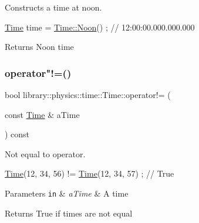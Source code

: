 Constructs a time at noon. 


\begin{DoxyCode}
\hyperlink{classlibrary_1_1physics_1_1time_1_1_time_a46a4b9be1451041ae65332f04db21c4b}{Time} time = \hyperlink{classlibrary_1_1physics_1_1time_1_1_time_a3d67891fe71e3b5ba62c6517477e7698}{Time::Noon}() ; \textcolor{comment}{// 12:00:00.000.000.000}
\end{DoxyCode}


\begin{DoxyReturn}{Returns}
Noon time 
\end{DoxyReturn}
\mbox{\label{classlibrary_1_1physics_1_1time_1_1_time_af2caee50ce2d4abd157645052a090db1}} 
\subsubsection{\texorpdfstring{operator"!=()}{operator!=()}}
{\footnotesize\ttfamily bool library\+::physics\+::time\+::\+Time\+::operator!= (\begin{DoxyParamCaption}\item[{const \hyperlink{classlibrary_1_1physics_1_1time_1_1_time}{Time} \&}]{a\+Time }\end{DoxyParamCaption}) const}



Not equal to operator. 


\begin{DoxyCode}
\hyperlink{classlibrary_1_1physics_1_1time_1_1_time_a46a4b9be1451041ae65332f04db21c4b}{Time}(12, 34, 56) != \hyperlink{classlibrary_1_1physics_1_1time_1_1_time_a46a4b9be1451041ae65332f04db21c4b}{Time}(12, 34, 57) ; \textcolor{comment}{// True}
\end{DoxyCode}



\begin{DoxyParams}[1]{Parameters}
\mbox{\tt in}  & {\em a\+Time} & A time \\
\hline
\end{DoxyParams}
\begin{DoxyReturn}{Returns}
True if times are not equal 
\end{DoxyReturn}
\mbox{\label{classlibrary_1_1physics_1_1time_1_1_time_ac566f208b63b58b5dae1328b4c24fbe6}} 
